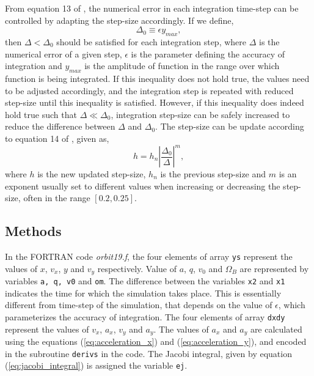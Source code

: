 \documentclass[a4paper]{article}
\begin{document}
	From equation 13 of \cite{lecture_3}, the numerical error in each integration time-step can be controlled by adapting the step-size accordingly. If we define,
	\begin{equation}
		\Delta_0 \equiv \epsilon y_{max},
		\label{eq:numerical_error}
	\end{equation}
	then \(\Delta < \Delta_0\) should be satisfied for each integration step, where \(\Delta\) is the numerical error of a given step, \(\epsilon\) is the parameter defining the accuracy of integration and \(y_{max}\) is the amplitude of function in the range over which function is being integrated. If this inequality does not hold true, the values need to be adjusted accordingly, and the integration step is repeated with reduced step-size until this inequality is satisfied. However, if this inequality does indeed hold true such that \(\Delta \ll \Delta_0\), integration step-size can be safely increased to reduce the difference between \(\Delta\) and \(\Delta_0\). The step-size can be update according to equation 14 of \cite{lecture_3}, given as,
	\begin{equation}
		h = h_n \left| \frac{\Delta_0}{\Delta} \right| ^m,
		\label{eq:stepsize}
	\end{equation}
	where \(h\) is the new updated step-size, \(h_n\) is the previous step-size and \(m\) is an exponent usually set to different values when increasing or decreasing the step-size, often in the range \([0.2,0.25]\). 
	
		
		\subsection{Methods} \label{methods1}
			
		In the FORTRAN code \emph{orbit19.f}, the four elements of array \texttt{ys} represent the values of \(x\), \(v_x\), \(y\) and \(v_y\) respectively. Value of \(a\), \(q\), \(v_0\) and \(\Omega_B\) are represented by variables \texttt{a, q, v0} and \texttt{om}. The difference between the variables \texttt{x2} and \texttt{x1} indicates the time for which the simulation takes place. This is essentially different from time-step of the simulation, that depends on the value of \(\epsilon\), which parameterizes the accuracy of integration. The four elements of array \texttt{dxdy} represent the values of \(v_x\), \(a_x\), \(v_y\) and \(a_y\). The values of \(a_x\) and \(a_y\) are calculated using the equations (\ref{eq:acceleration_x}) and (\ref{eq:acceleration_y}), and encoded in the subroutine \texttt{derivs} in the code. The Jacobi integral, given by equation (\ref{eq:jacobi_integral}) is assigned the variable \texttt{ej}. \\
		
\end{document}
